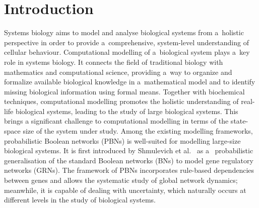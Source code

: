 \documentclass[runningheads,a4paper]{llncs}
\begin{document}
\section{Introduction}
\label{sec:intro}
Systems biology aims to model and analyse biological systems from a~holistic perspective in order
to provide a~comprehensive, system-level understanding of cellular behaviour. Computational
modelling of a~biological system plays a~key role in systems biology. It connects the field of
traditional biology with mathematics and computational science, providing a~way to organize and
formalize available biological knowledge in a~mathematical model and to identify missing
biological information using formal means. Together with biochemical techniques, computational
modelling promotes the holistic understanding of real-life biological systems, leading to the
study of large biological systems. This brings a significant challenge to computational modelling
in terms of the state-space size of the system under study. Among the existing modelling
frameworks, probabilistic Boolean networks (PBNs) is well-suited for modelling large-size
biological systems. It is first introduced by Shmulevich et al.~\cite{SD10,TMPTSS13} as
a~ probabilistic generalisation of the standard Boolean networks (BNs) to model gene regulatory
networks (GRNs). The framework of PBNs incorporates rule-based dependencies between genes and
allows the systematic study of global network dynamics; meanwhile, it is capable of dealing with
uncertainty, which naturally occurs at different levels in the study of biological systems.

\end{document}
